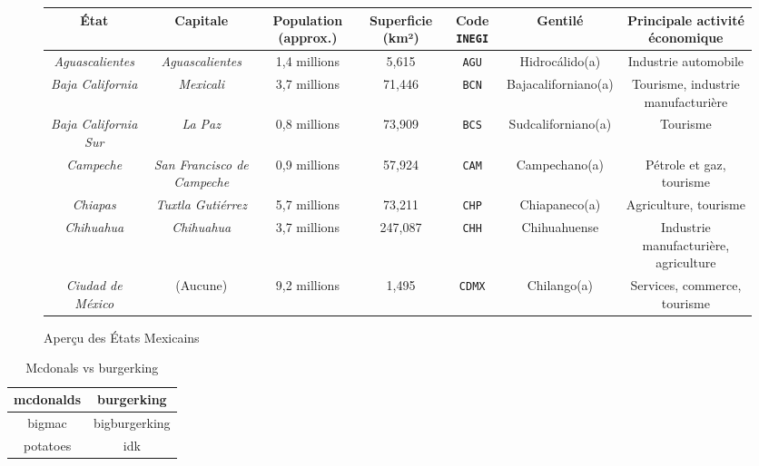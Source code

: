 \documentclass[12pt, a4paper]{article}
\begin{document}
\begin{figure}[h!]
    \centering
    \begin{tabular}{|c|c|c|c|c|c|c|}
        \hline
        \textbf{\'{E}tat} & \textbf{Capitale} & \textbf{Population (approx.)} & \textbf{Superficie (km²)} & \textbf{Code \texttt{INEGI}} & \textbf{Gentil\'{e}} & \textbf{Principale activit\'{e} \'{e}conomique} \\
        \hline
        \textit{Aguascalientes} & \textit{Aguascalientes} & 1,4 millions & 5,615 & \texttt{AGU} & Hidroc\'{a}lido(a) & Industrie automobile \\
        \textit{Baja California} & \textit{Mexicali} & 3,7 millions & 71,446 & \texttt{BCN} & Bajacaliforniano(a) & Tourisme, industrie manufacturière \\
        \textit{Baja California Sur} & \textit{La Paz} & 0,8 millions & 73,909 & \texttt{BCS} & Sudcaliforniano(a) & Tourisme \\
        \textit{Campeche} & \textit{San Francisco de Campeche} & 0,9 millions & 57,924 & \texttt{CAM} & Campechano(a) & P\'{e}trole et gaz, tourisme \\
        \textit{Chiapas} & \textit{Tuxtla Guti\'{e}rrez} & 5,7 millions & 73,211 & \texttt{CHP} & Chiapaneco(a) & Agriculture, tourisme \\
        \textit{Chihuahua} & \textit{Chihuahua} & 3,7 millions & 247,087 & \texttt{CHH} & Chihuahuense & Industrie manufacturière, agriculture \\
        \textit{Ciudad de M\'{e}xico} & (Aucune) & 9,2 millions & 1,495 & \texttt{CDMX} & Chilango(a) & Services, commerce, tourisme \\
        \hline
    \end{tabular}
    \caption{Aper\c{c}u des \'{E}tats Mexicains}
    \label{tab:etats_mexicains}
\end{figure}
    
\begin{table}[h!]
    \centering
    \begin{tabular}{|c|c|}
        \hline
        mcdonalds & burgerking \\
        \hline
        bigmac & bigburgerking \\
        \hline
potatoes & idk \\
        \hline
    \end{tabular}
    \caption{Mcdonals vs burgerking}
    \label{tab:my_label}
\end{table}
\end{document}
